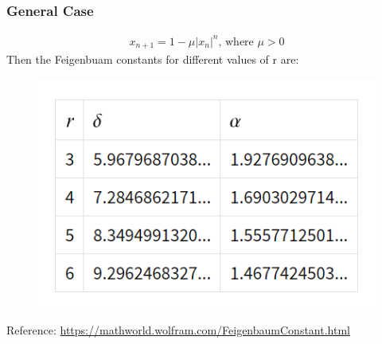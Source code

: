 \documentclass[
	11pt, %
	aspectratio=169, %
]{beamer}
\begin{document}

\begin{frame}
        \frametitle{General Case}
        \begin{align*}
            x_{n+1} = 1 - \mu |x_{n}|^{n} \text{, where $\mu > 0$}
        \end{align*}
        Then the Feigenbuam constants for different values of r are:
        \begin{figure}
            \includegraphics[width=0.4\linewidth]
            {feigenbaum_for_different_r.png}
        \end{figure}
        \vspace{-5mm}
        Reference: \url{https://mathworld.wolfram.com/FeigenbaumConstant.html}
\end{frame}

\end{document}
